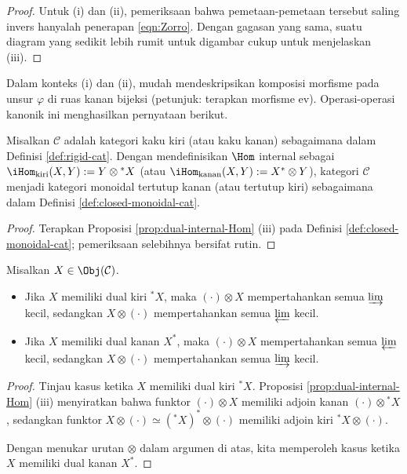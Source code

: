 \begin{proof}
	Untuk (i) dan (ii), pemeriksaan bahwa pemetaan-pemetaan tersebut saling invers hanyalah penerapan \eqref{eqn:Zorro}. Dengan gagasan yang sama, suatu diagram yang sedikit lebih rumit untuk digambar cukup untuk menjelaskan (iii).
\end{proof}

Dalam konteks (i) dan (ii), mudah mendeskripsikan komposisi morfisme pada unsur $\varphi$ di ruas kanan bijeksi (petunjuk: terapkan morfisme $\mathrm{ev}$). Operasi-operasi kanonik ini menghasilkan pernyataan berikut.

\begin{corollary}\label{prop:rigid-Hom-internal}
	Misalkan $\mathcal{C}$ adalah kategori kaku kiri (atau kaku kanan) sebagaimana dalam Definisi \ref{def:rigid-cat}. Dengan mendefinisikan $\Hom$ internal sebagai $\iHom_{\text{kiri}}(X, Y) := Y \otimes {}^* X$ (atau $\iHom_{\text{kanan}}(X, Y) := X^* \otimes Y$), kategori $\mathcal{C}$ menjadi kategori monoidal tertutup kanan (atau tertutup kiri) sebagaimana dalam Definisi \ref{def:closed-monoidal-cat}.
\end{corollary}
\begin{proof}
	Terapkan Proposisi \ref{prop:dual-internal-Hom} (iii) pada Definisi \ref{def:closed-monoidal-cat}; pemeriksaan selebihnya bersifat rutin.
\end{proof}

\begin{corollary}\label{prop:rigid-exact}
	Misalkan $X \in \Obj(\mathcal{C})$.
	\begin{itemize}
		\item Jika $X$ memiliki dual kiri ${}^* X$, maka $(\cdot) \otimes X$ mempertahankan semua $\varinjlim$ kecil, sedangkan $X \otimes (\cdot)$ mempertahankan semua $\varprojlim$ kecil.
		\item Jika $X$ memiliki dual kanan $X^*$, maka $(\cdot) \otimes X$ mempertahankan semua $\varprojlim$ kecil, sedangkan $X \otimes (\cdot)$ mempertahankan semua $\varinjlim$ kecil.
	\end{itemize}
\end{corollary}
\begin{proof}
	Tinjau kasus ketika $X$ memiliki dual kiri ${}^* X$. Proposisi \ref{prop:dual-internal-Hom} (iii) menyiratkan bahwa funktor $(\cdot) \otimes X$ memiliki adjoin kanan $(\cdot) \otimes {}^* X$, sedangkan funktor $X \otimes (\cdot) \simeq ({}^* X)^* \otimes (\cdot)$ memiliki adjoin kiri ${}^* X \otimes (\cdot)$.
	
	Dengan menukar urutan $\otimes$ dalam argumen di atas, kita memperoleh kasus ketika $X$ memiliki dual kanan $X^*$.
\end{proof}
